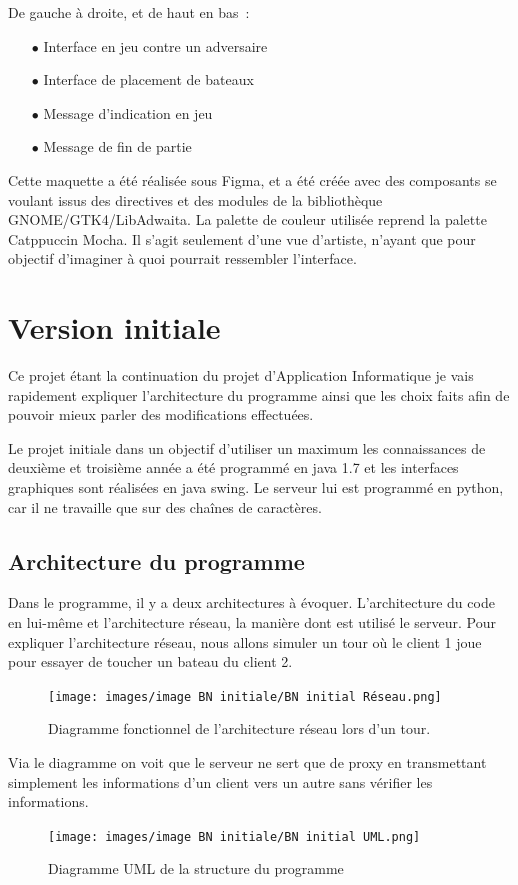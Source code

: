 \documentclass[12pt]{article}
\begin{document}
De gauche à droite, et de haut en bas :
\begin{itemize}
      \item[$\bullet$] Interface en jeu contre un adversaire
      \item[$\bullet$] Interface de placement de bateaux
      \item[$\bullet$] Message d'indication en jeu
      \item[$\bullet$] Message de fin de partie
\end{itemize}

\bigskip

Cette maquette a été réalisée sous Figma, et a été créée avec des composants se
voulant issus des directives et des modules de la bibliothèque \\
GNOME/GTK4/LibAdwaita. La palette de couleur utilisée reprend la palette
Catppuccin Mocha.
Il s'agit seulement d'une vue d'artiste, n'ayant que pour objectif d'imaginer à
quoi pourrait ressembler l'interface.

\newpage

\section{Version initiale}
Ce projet étant la continuation du projet d'Application Informatique je vais
rapidement expliquer l'architecture du programme ainsi que les choix faits afin
de pouvoir mieux parler des modifications effectuées.

\bigskip

Le projet initiale dans un objectif d'utiliser un maximum les connaissances de
deuxième et troisième année a été programmé en java 1.7 et les interfaces
graphiques
sont réalisées en java swing. Le serveur lui est programmé en python, car il ne
travaille que sur des chaînes de caractères.

\bigskip

\subsection{Architecture du programme}
Dans le programme, il y a deux architectures à évoquer. L'architecture du code
en lui-même et l'architecture réseau, la manière dont est utilisé le serveur.
\bigskip
Pour expliquer l'architecture réseau, nous allons simuler un tour où le client
1 joue pour essayer de toucher un bateau du client 2.
\begin{figure}[H]
      \centering
      \texttt{[image: images/image BN initiale/BN initial
            Réseau.png]}
      \caption{Diagramme fonctionnel de l'architecture réseau lors d'un tour.}
\end{figure}
\bigskip
Via le diagramme on voit que le serveur ne sert que de proxy en transmettant
simplement les informations d'un client vers un autre sans vérifier les
informations.
\begin{figure}[H]
      \centering
      \texttt{[image: images/image BN initiale/BN initial
            UML.png]}
      \caption{Diagramme UML de la structure du programme}
\end{figure}
\bigskip
\end{document}
